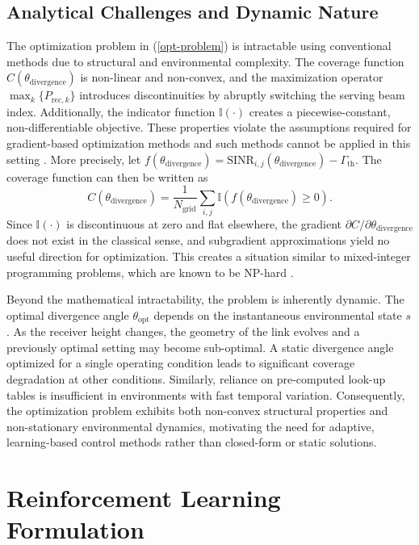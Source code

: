 \documentclass[twocolumn,twoside]{IEEEtran}
\theoremstyle{break}
\begin{document}
	
	\subsection{Analytical Challenges and Dynamic Nature}
	
	The optimization problem in (\ref{opt-problem}) is intractable using conventional methods due to structural and environmental complexity. The coverage function $C(\theta_{\text{divergence}})$ is non-linear and non-convex, and the maximization operator $\max_k\{P_{\text{rec},k}\}$ introduces discontinuities by abruptly switching the serving beam index. Additionally, the indicator function $\mathbb{I}(\cdot)$ creates a piecewise-constant, non-differentiable objective. These properties violate the assumptions required for gradient-based optimization methods and such methods cannot be applied in this setting \cite{boyd2004convex}.
	More precisely, let $f(\theta_{\text{divergence}}) = \text{SINR}_{i,j}(\theta_{\text{divergence}}) - \Gamma_{\text{th}}$. The coverage function can then be written as 
	\begin{equation}
		C(\theta_{\text{divergence}}) = \frac{1}{N_{\text{grid}}} \sum_{i,j} \mathbb{I}(f(\theta_{\text{divergence}}) \geq 0).
	\end{equation}
	Since $\mathbb{I}(\cdot)$ is discontinuous at zero and flat elsewhere, the gradient $\partial C/\partial \theta_{\text{divergence}}$ does not exist in the classical sense, and subgradient approximations yield no useful direction for optimization. This creates a situation similar to mixed-integer programming problems, which are known to be NP-hard \cite{boyd2004convex}. 
	
	Beyond the mathematical intractability, the problem is inherently dynamic. The optimal divergence angle $\theta_{\text{opt}}$ depends on the instantaneous environmental state $s$. As the receiver height changes, the geometry of the link evolves and a previously optimal setting may become sub-optimal. A static divergence angle optimized for a single operating condition leads to significant coverage degradation at other conditions. Similarly, reliance on pre-computed look-up tables is insufficient in environments with fast temporal variation. 	Consequently, the optimization problem exhibits both non-convex structural properties and non-stationary environmental dynamics, motivating the need for adaptive, learning-based control methods rather than closed-form or static solutions.
	\section{Reinforcement Learning Formulation}
	\label{sec:rl_optimization}
	
\end{document}
